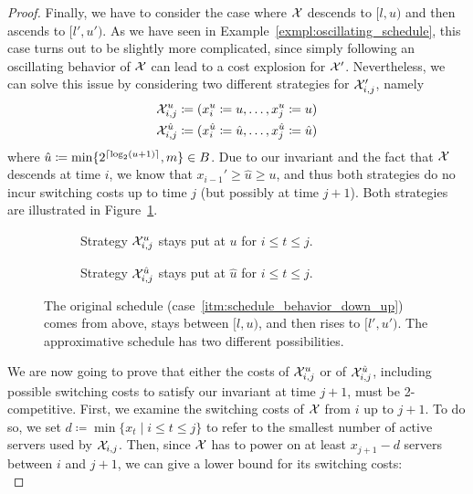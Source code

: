 \begin{proof}
Finally, we have to consider the case where $\mathcal{X}$ descends to $[l,u)$ and then ascends to $[l',u')$. As we have seen in Example~\ref{exmpl:oscillating_schedule}, this case turns out to be slightly more complicated, since simply following an oscillating behavior of $\mathcal{X}$ can lead to a cost explosion for $\mathcal{X}'$. Nevertheless, we can solve this issue by considering two different strategies for $\mathcal{X}_{i,j}'$, namely
\begin{align*}
	\mathcal{X}_{i,j}^u&\coloneqq(x_i^u\coloneqq u,\dotsc,x_j^u\coloneqq u)\\
	\mathcal{X}_{i,j}^{\hat{u}}&\coloneqq(x_i^{\hat{u}}\coloneqq\hat{u},\dotsc,x_j^{\hat{u}}\coloneqq\hat{u})
\end{align*}
where $\hat{u}\coloneqq\min\{2^{\lceil\log_2(u+1)\rceil},m\}\in B$. Due to our invariant and the fact that $\mathcal{X}$ descends at time $i$, we know that $x_{i-1}'\ge \hat{u}\ge u$, and thus both strategies do no incur switching costs up to time $j$ (but possibly at time $j+1$). Both strategies are illustrated in Figure~\ref{fig:schedule_behavior_down_up}.
\begin{figure}[H]
\captionsetup[subfigure]{labelformat=empty}
\begin{subfigure}[b]{0.48\textwidth}

\caption{Strategy $\mathcal{X}_{i,j}^u$ stays put at $u$ for $i\le t\le j$.}
\end{subfigure}
\hfill
\begin{subfigure}[b]{0.48\textwidth}

\caption{Strategy $\mathcal{X}_{i,j}^{\hat{u}}$ stays put at $\hat{u}$ for $i\le t\le j$.}
\end{subfigure}
\caption{The original schedule (case~\ref{itm:schedule_behavior_down_up}) comes from above, stays between $[l,u)$, and then rises to $[l',u')$. The approximative schedule has two different possibilities.}
\label{fig:schedule_behavior_down_up}
\end{figure}
We are now going to prove that either the costs of $\mathcal{X}_{i,j}^u$ or of $\mathcal{X}_{i,j}^{\hat{u}}$, including possible switching costs to satisfy our invariant at time $j+1$, must be 2-competitive. 
First, we examine the switching costs of $\mathcal{X}$ from $i$ up to $j+1$. To do so, we set $d\coloneqq\min\{x_t\mid i\le t\le j\}$ to refer to the smallest number of active servers used by $\mathcal{X}_{i,j}$. Then, since $\mathcal{X}$ has to power on at least $x_{j+1}-d$ servers between $i$ and $j+1$, we can give a lower bound for its switching costs:
\begin{equation*}

\end{equation*}
\end{proof}
